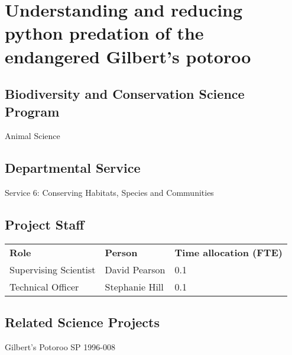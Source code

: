 \documentclass[version=last,
    paper=a4,                               %
    10pt,                                   %
    dvipsnames,
    oneside,                              %
    headings=openany,                       %
    open=any,
    BCOR=7mm,                               %
    DIV=15,     %
]{scrbook}
\begin{document}
\frontmatter
\maketitle
\mainmatter



\section*{Understanding and reducing python predation of the endangered Gilbert's
potoroo
}



\subsection*{Biodiversity and Conservation Science Program}

Animal Science




\subsection*{Departmental Service}

Service 6: Conserving Habitats, Species and Communities


\subsection*{Project Staff}
\begin{tabu} {X X X}
\textbf{Role} & \textbf{Person} & \textbf{Time allocation (FTE)}\\

Supervising Scientist & David Pearson & 0.1\\

Technical Officer & Stephanie Hill & 0.1\\

\end{tabu}




\subsection*{Related Science Projects}

Gilbert's Potoroo SP 1996-008
\end{document}
